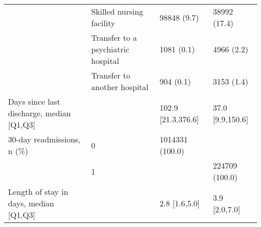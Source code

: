 \begin{tabular}{llll}
                                       & Skilled nursing facility &                    98848 (9.7) &      38992 (17.4) \\
                                       & Transfer to a psychiatric hospital &                     1081 (0.1) &        4966 (2.2) \\
                                       & Transfer to another hospital &                      904 (0.1) &        3153 (1.4) \\
Days since last discharge, median [Q1,Q3] &   &             102.9 [21.3,376.6] &  37.0 [9.9,150.6] \\
30-day readmissions, n (\%) & 0 &                1014331 (100.0) &                   \\
                                       & 1 &                                &    224709 (100.0) \\
Length of stay in days, median [Q1,Q3] &   &                  2.8 [1.6,5.0] &     3.9 [2.0,7.0] \\
\bottomrule
\end{tabular}
